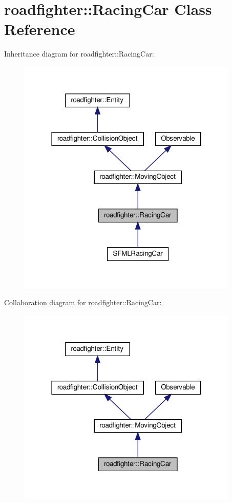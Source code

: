 \hypertarget{classroadfighter_1_1RacingCar}{}\section{roadfighter\+:\+:Racing\+Car Class Reference}
\label{classroadfighter_1_1RacingCar}


Inheritance diagram for roadfighter\+:\+:Racing\+Car\+:\nopagebreak
\begin{figure}[H]
\begin{center}
\leavevmode
\includegraphics[width=298pt]{classroadfighter_1_1RacingCar__inherit__graph}
\end{center}
\end{figure}


Collaboration diagram for roadfighter\+:\+:Racing\+Car\+:\nopagebreak
\begin{figure}[H]
\begin{center}
\leavevmode
\includegraphics[width=298pt]{classroadfighter_1_1RacingCar__coll__graph}
\end{center}
\end{figure}
